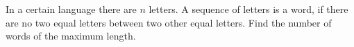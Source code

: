 In a certain language there are $n$ letters. A sequence of letters is a word, if there are no two equal letters between two other equal letters. Find the number of words of the maximum length.